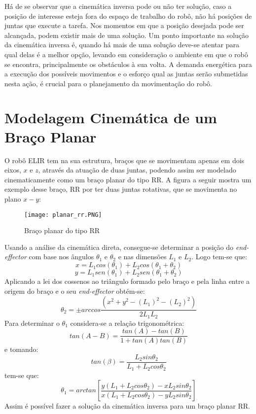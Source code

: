 Há de se observar que a cinemática inversa pode ou não ter solução, caso a posição de interesse esteja fora do espaço de trabalho do robô, não há posições de juntas que execute a tarefa. Nos momentos em que a posição desejada pode ser alcançada, podem existir mais de uma solução. Um ponto importante na solução da cinemática inversa é, quando há mais de uma solução deve-se atentar para qual delas é a melhor opção, levando em consideração o ambiente em que o robô se encontra, principalmente os obstáculos à sua volta. A demanda energética para a execução dos possíveis movimentos e o esforço qual as juntas serão submetidas nesta ação, é crucial para o planejamento da movimentação do robô.


\section{Modelagem Cinemática de um Braço Planar}\label{sec:brac_plan}
O robô ELIR tem na sua estrutura, braços que se movimentam apenas em dois eixos, $x$ e $z$, através da atuação de duas juntas, podendo assim ser modelado cinematicamente como um braço planar do tipo RR. A figura a seguir mostra um exemplo desse braço, RR por ter duas juntas rotativas, que se movimenta no plano $x-y$:

\begin{figure}[h!]												
	\centering												
	\texttt{[image: planar\_rr.PNG]}			
	\caption{Braço planar do tipo RR}		
	\label{img:planar}	
\end{figure}

Usando a análise da cinemática direta, consegue-se determinar a posição do \textit{end-effector} com base nos ângulos $\theta_{1}$ e $\theta_{2}$ e nas dimensões $L_{1}$ e $L_{2}$. Logo tem-se que:
\begin{equation}
x=L_1cos{(\theta_1)}+L_2cos{(\theta_1 + \theta_2)}
\end{equation}
\begin{equation}
y=L_{1}sen{(\theta_1)}+L_{2}sen{(\theta_1 + \theta_2)}
\end{equation}
Aplicando a lei dos cossenos ao triângulo formado pelo braço e pela linha entre a origem do braço e o seu \textit{end-effector} obtém-se: 
\begin{equation}
\theta_2=\pm arccos{\frac{(x^2+y^2-(L_1)^2-(L_2)^2)}{2L_1L_2}}
\end{equation}
Para determinar o $\theta_{1}$ considera-se a relação trigonométrica:
\begin{equation}
tan{(A - B)}=\frac{tan(A)-tan(B)}{1+tan(A) tan(B)}
\end{equation}
e tomando:
\begin{equation}
tan(\beta)=\frac{L_2 sin\theta_2}{L_1 + L_2 cos\theta_2}
\end{equation}
tem-se que:
\begin{equation}
\theta_1 = arctan[\frac{y(L_1 + L_2 cos\theta_2)-xL_2 sin\theta_2}{x(L_1 + L_2 cos\theta_2)-yL_2 sin\theta_2}]
\end{equation}
Assim é possível fazer a solução da cinemática inversa para um braço planar RR.

